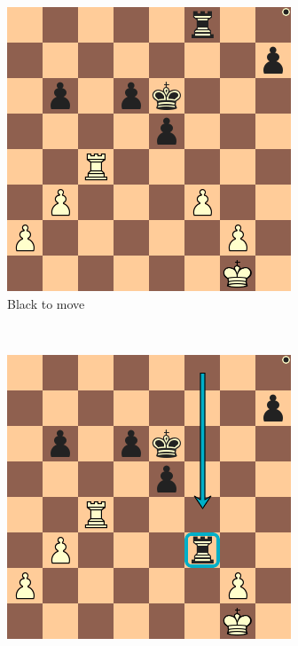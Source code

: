 \begin{figure}
    \centering
    \begin{subfigure}[b]{0.3\textwidth}
        \includegraphics[width=\textwidth]{fig/diagram_qs_1}
        \caption{Black to move}
        \label{fig:qs1}
    \end{subfigure}
    ~ %
    \begin{subfigure}[b]{0.3\textwidth}
        \includegraphics[width=\textwidth]{fig/diagram_qs_2}

\end{subfigure}
\end{figure}
